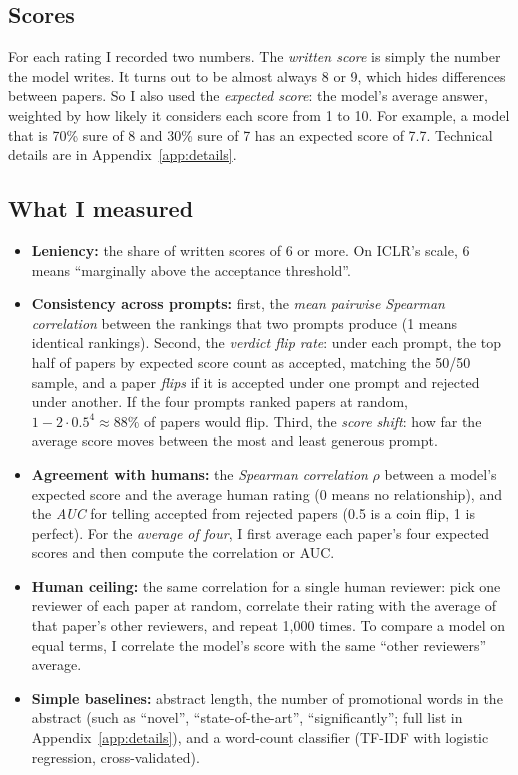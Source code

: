\documentclass[11pt]{article}
\begin{document}
\subsection{Scores}
For each rating I recorded two numbers. The \emph{written score} is simply the number the model writes. It turns out to be almost always 8 or 9, which hides differences between papers. So I also used the \emph{expected score}: the model's average answer, weighted by how likely it considers each score from 1 to 10. For example, a model that is 70\% sure of 8 and 30\% sure of 7 has an expected score of 7.7. Technical details are in Appendix~\ref{app:details}.

\subsection{What I measured}
\begin{itemize}
  \item \textbf{Leniency:} the share of written scores of 6 or more. On ICLR's scale, 6 means ``marginally above the acceptance threshold''.
  \item \textbf{Consistency across prompts:} first, the \emph{mean pairwise Spearman correlation} between the rankings that two prompts produce (1 means identical rankings). Second, the \emph{verdict flip rate}: under each prompt, the top half of papers by expected score count as accepted, matching the 50/50 sample, and a paper \emph{flips} if it is accepted under one prompt and rejected under another. If the four prompts ranked papers at random, $1 - 2 \cdot 0.5^4 \approx 88\%$ of papers would flip. Third, the \emph{score shift}: how far the average score moves between the most and least generous prompt.
  \item \textbf{Agreement with humans:} the \emph{Spearman correlation} $\rho$ between a model's expected score and the average human rating (0 means no relationship), and the \emph{AUC} for telling accepted from rejected papers (0.5 is a coin flip, 1 is perfect). For the \emph{average of four}, I first average each paper's four expected scores and then compute the correlation or AUC.
  \item \textbf{Human ceiling:} the same correlation for a single human reviewer: pick one reviewer of each paper at random, correlate their rating with the average of that paper's other reviewers, and repeat 1,000 times. To compare a model on equal terms, I correlate the model's score with the same ``other reviewers'' average.
  \item \textbf{Simple baselines:} abstract length, the number of promotional words in the abstract (such as ``novel'', ``state-of-the-art'', ``significantly''; full list in Appendix~\ref{app:details}), and a word-count classifier (TF-IDF with logistic regression, cross-validated).
\end{itemize}
\end{document}
